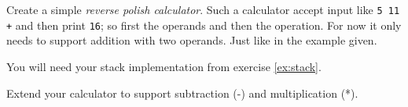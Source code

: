 \begin{Exercise}[title={Calculator},difficulty=7]
\label{ex:calc}
\Question \label{ex:calc q1} Create a simple \emph{reverse polish calculator}. Such a calculator
accept input like \texttt{5 11 +} and then print \texttt{16}; so first the operands and then the
operation. For now it only needs to support addition with two operands. Just like in the
example given.

You will need your stack implementation from exercise \ref{ex:stack}.

\Question \label{ex:calc q2} Extend your calculator to support subtraction (-) and multiplication (*).
\end{Exercise}

\begin{Answer}

\Question

\Question

\end{Answer}

